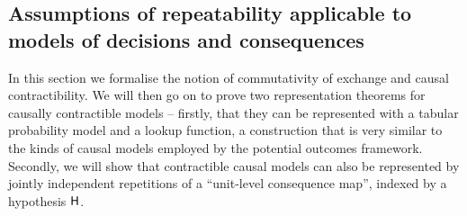 









\subsection{Assumptions of repeatability applicable to models of decisions and consequences}

In this section we formalise the notion of commutativity of exchange and causal contractibility. We will then go on to prove two representation theorems for causally contractible models -- firstly, that they can be represented with a tabular probability model and a lookup function, a construction that is very similar to the kinds of causal models employed by the potential outcomes framework. Secondly, we will show that contractible causal models can also be represented by jointly independent repetitions of a ``unit-level consequence map'', indexed by a hypothesis $\mathsf{H}$.

